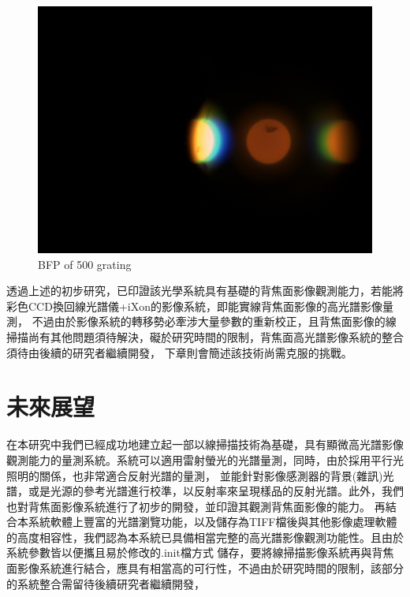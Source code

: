 \documentclass[12pt]{article}
\begin{document}
\begin{figure}[h]
    \centering
    \includegraphics[width = 0.8\linewidth]{500bfp.jpeg}
    \caption{BFP of 500 grating}
    \label{fig: 500 bfp}
\end{figure}

透過上述的初步研究，已印證該光學系統具有基礎的背焦面影像觀測能力，若能將彩色CCD換回線光譜儀+iXon的影像系統，即能實線背焦面影像的高光譜影像量測，
不過由於影像系統的轉移勢必牽涉大量參數的重新校正，且背焦面影像的線掃描尚有其他問題須待解決，礙於研究時間的限制，背焦面高光譜影像系統的整合須待由後續的研究者繼續開發，
下章則會簡述該技術尚需克服的挑戰。

\section{未來展望}
在本研究中我們已經成功地建立起一部以線掃描技術為基礎，具有顯微高光譜影像觀測能力的量測系統。系統可以適用雷射螢光的光譜量測，同時，由於採用平行光照明的關係，也非常適合反射光譜的量測，
並能針對影像感測器的背景(雜訊)光譜，或是光源的參考光譜進行校準，以反射率來呈現樣品的反射光譜。此外，我們也對背焦面影像系統進行了初步的開發，並印證其觀測背焦面影像的能力。
再結合本系統軟體上豐富的光譜瀏覽功能，以及儲存為TIFF檔後與其他影像處理軟體的高度相容性，我們認為本系統已具備相當完整的高光譜影像觀測功能性。且由於系統參數皆以便攜且易於修改的.init檔方式
儲存，要將線掃描影像系統再與背焦面影像系統進行結合，應具有相當高的可行性，不過由於研究時間的限制，該部分的系統整合需留待後續研究者繼續開發，
\end{document}
